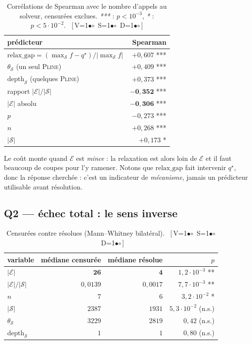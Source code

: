 \documentclass[11pt,a4paper]{article}
\theoremstyle{plain}
\theoremstyle{remark}
\newcommand{\Ecal}{\mathcal{E}}
\newcommand{\Scal}{\mathcal{S}}
\newcommand{\ILP}{\textsc{Pline}}
\newcommand{\qs}{q^{\star}}
\newcommand{\cfgm}[1]{\ifnum#1=1$\bullet$\else$\circ$\fi}
\newcommand{\conf}[3]{%
  \textsf{\footnotesize[\,V\cfgm{#1}\ S\cfgm{#2}\ D\cfgm{#3}\,]}}
\begin{document}
\begin{table}[H]
\centering
\caption{Corrélations de Spearman avec le nombre d'appels au solveur,
censurées exclues. \emph{***} : $p<10^{-3}$, \emph{*} : $p<5\cdot 10^{-2}$.\ \conf{0}{0}{0}}
\begin{tabular}{lr}
\toprule
prédicteur & Spearman\\
\midrule
$\text{relax\_gap}=(\max_{\Scal}f-\qs)/|\max_{\Scal}f|$ & $+0{,}607$ ***\\
$\theta_{\Scal}$ (un seul \ILP) & $+0{,}409$ ***\\
$\text{depth}_{\Scal}$ (quelques \ILP) & $+0{,}373$ ***\\
rapport $|\Ecal|/|\Scal|$ & $\mathbf{-0{,}352}$ ***\\
$|\Ecal|$ absolu & $\mathbf{-0{,}306}$ ***\\
$p$ & $-0{,}273$ ***\\
$n$ & $+0{,}268$ ***\\
$|\Scal|$ & $+0{,}173$ *\\
\bottomrule
\end{tabular}
\end{table}

\noindent
Le coût monte quand $\Ecal$ est \emph{mince} : la relaxation est alors loin de
$\Ecal$ et il faut beaucoup de coupes pour l'y ramener. Notons que
$\text{relax\_gap}$ fait intervenir $\qs$, donc la réponse cherchée : c'est
un indicateur de \emph{mécanisme}, jamais un prédicteur utilisable avant
résolution.

\subsection{Q2 --- échec total : le sens inverse}

\begin{table}[H]
\centering
\caption{Censurées contre résolues (Mann--Whitney bilatéral).\ \conf{0}{0}{0}}
\begin{tabular}{lrrr}
\toprule
variable & médiane censurée & médiane résolue & $p$\\
\midrule
$|\Ecal|$ & $\mathbf{26}$ & $\mathbf{4}$ & $1{,}2\cdot 10^{-3}$ **\\
$|\Ecal|/|\Scal|$ & $0{,}0139$ & $0{,}0017$ & $7{,}7\cdot 10^{-3}$ **\\
$n$ & $7$ & $6$ & $3{,}2\cdot 10^{-2}$ *\\
$|\Scal|$ & $2387$ & $1931$ & $5{,}3\cdot 10^{-2}$ (n.s.)\\
$\theta_{\Scal}$ & $3229$ & $2819$ & $0{,}42$ (n.s.)\\
$\text{depth}_{\Scal}$ & $1$ & $1$ & $0{,}80$ (n.s.)\\
\bottomrule
\end{tabular}
\end{table}
\end{document}
